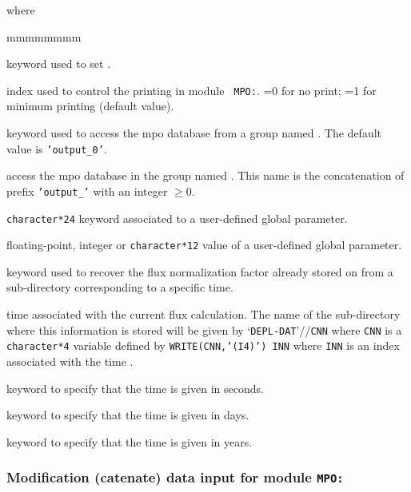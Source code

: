 \goodbreak
\noindent where
\begin{ListeDeDescription}{mmmmmmmm}

\item[\moc{EDIT}] keyword used to set .

\item[\dusa{iprint}] index used to control the printing in module {\tt
MPO:}. =0 for no print; =1 for minimum printing (default value).

\item[\moc{STEP}] keyword used to access the {\sc mpo} database from a group named .
The default value is {\tt 'output\_0'}.

\item[\dusa{NAMDIR}] access the {\sc mpo} database in the group named . This name is
the concatenation of prefix {\tt 'output\_'} with an integer $\ge 0$.

\item[\dusa{parkey}] {\tt character*24} keyword associated to a user-defined global
parameter.

\item[\dusa{value}] floating-point, integer or {\tt character*12} value of a user-defined
global parameter.

\item[\moc{SET}] keyword used to recover the flux normalization factor already
stored on  from a sub-directory corresponding to a specific time.

\item[\dusa{xtr}] time associated with the current flux calculation. The
name of the sub-directory where this information is stored will be given by
`{\tt DEPL-DAT}'//{\tt CNN} where {\tt CNN} is a  {\tt character*4} variable
defined by  {\tt WRITE(CNN,'(I4)') INN} where {\tt INN} is an index associated
with the time .

\item[\moc{S}] keyword to specify that the time is given in seconds.

\item[\moc{DAY}] keyword to specify that the time is given in days.

\item[\moc{YEAR}] keyword to specify that the time is given in years.

\end{ListeDeDescription}

\subsubsection{Modification (catenate) data input for module {\tt MPO:}}\label{sect:descmpo3}


